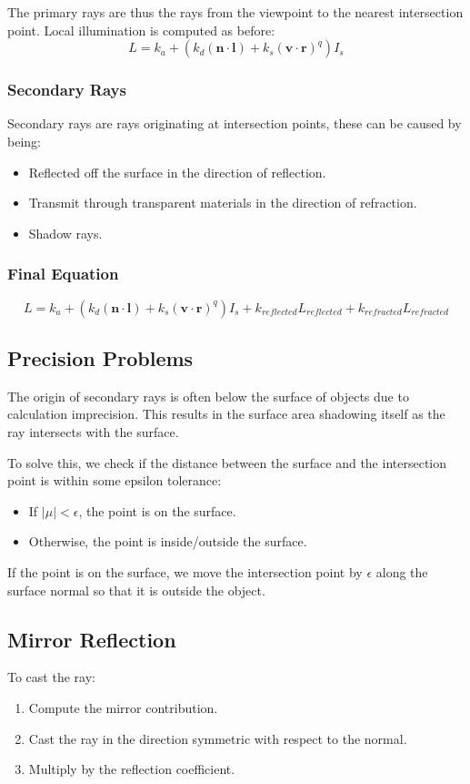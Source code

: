 \documentclass[11pt]{article}
\begin{document}
The primary rays are thus the rays from the viewpoint to the nearest intersection point.
Local illumination is computed as before:
\[
  L = k_a + (k_d (\textbf{n} \cdot \textbf{l}) + k_s(\textbf{v} \cdot \textbf{r})^q)I_s 
\]

\subsubsection{Secondary Rays}
Secondary rays are rays originating at intersection points, these can be caused by being:
\begin{itemize}
  \item Reflected off the surface in the direction of reflection.
  \item Transmit through transparent materials in the direction of refraction.
  \item Shadow rays.
\end{itemize}

\subsubsection{Final Equation}
\[
  L = k_a + (k_d (\textbf{n} \cdot \textbf{l}) + k_s(\textbf{v} \cdot \textbf{r})^q)I_s + k_{reflected} L_{reflected} + k_{refracted}L_{refracted}
\]

\subsection{Precision Problems}
\label{sec:epsilon}
The origin of secondary rays is often below the surface of objects due to calculation imprecision.
This results in the surface area shadowing itself as the ray intersects with the surface.

To solve this, we check if the distance between the surface and the intersection point is within some epsilon tolerance:
\begin{itemize}
  \item If $ \lvert \mu \rvert < \epsilon$, the point is on the surface.
  \item Otherwise, the point is inside/outside the surface.
\end{itemize}

If the point is on the surface, we move the intersection point by $\epsilon$ along the surface normal so that it is outside the object.

\subsection{Mirror Reflection}
To cast the ray:
\begin{enumerate}
  \item Compute the mirror contribution.
  \item Cast the ray in the direction symmetric with respect to the normal.
  \item Multiply by the reflection coefficient.
\end{enumerate}
\end{document}
